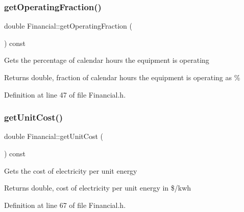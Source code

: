 \subsubsection{\texorpdfstring{get\+Operating\+Fraction()}{getOperatingFraction()}\hspace{0.1cm}{\footnotesize\ttfamily [3/3]}}
{\footnotesize\ttfamily double Financial\+::get\+Operating\+Fraction (\begin{DoxyParamCaption}{ }\end{DoxyParamCaption}) const\hspace{0.3cm}{\ttfamily [inline]}}

Gets the percentage of calendar hours the equipment is operating

\begin{DoxyReturn}{Returns}
double, fraction of calendar hours the equipment is operating as \% 
\end{DoxyReturn}


Definition at line 47 of file Financial.\+h.

\mbox{\label{class_financial_adc3092e8f4cfd065042638236d21eaf4}} 
\subsubsection{\texorpdfstring{get\+Unit\+Cost()}{getUnitCost()}\hspace{0.1cm}{\footnotesize\ttfamily [1/3]}}
{\footnotesize\ttfamily double Financial\+::get\+Unit\+Cost (\begin{DoxyParamCaption}{ }\end{DoxyParamCaption}) const\hspace{0.3cm}{\ttfamily [inline]}}

Gets the cost of electricity per unit energy

\begin{DoxyReturn}{Returns}
double, cost of electricity per unit energy in \$/kwh 
\end{DoxyReturn}


Definition at line 67 of file Financial.\+h.

\mbox{\label{class_financial_adc3092e8f4cfd065042638236d21eaf4}} 
